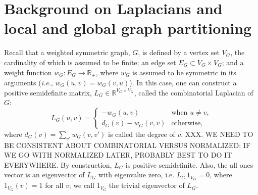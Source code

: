 \documentclass[12pt]{article}
\newcommand{\reals}{\mathbb{R}}
\theoremstyle{plain}
\begin{document}
\section{Background on Laplacians and local and global graph partitioning}
\label{S:introduction}

Recall that a weighted symmetric graph, $G$, is defined by a vertex set 
$V_G$, the cardinality of which 
is assumed to be finite; 
an edge set $E_G \subset V_G \times V_G$; 
and a weight function $w_G : E_G \to \reals_+$, where $w_G$ is assumed to 
be symmetric in its arguments (\emph{i.e.}, $w_G(u,v) = w_G(v,u)$).  
In this case, one can construct a positive
semidefinite matrix, $L_G \in \reals^{V_G \times V_G}$, called the 
combinatorial Laplacian of $G$:
\[
  L_G(u,v)
  =
  \begin{cases}
    - w_G(u,v) & \text{when $u \neq v$,} \\
    d_G(v) - w_G(v,v) & \text{otherwise,}
  \end{cases}
\]
where $d_G(v) = \sum_{v'} w_G(v,v')$ is called the degree of $v$.
XXX.  WE NEED TO BE CONSISTENT ABOUT COMBINATORIAL VERSUS NORMALIZED; IF WE GO WITH NORMALIZED LATER, PROBABLY BEST TO DO IT EVERYWHERE.
By construction, $L_G$ is positive semidefinite.  
Also, the all ones
vector is an eigenvector of $L_G$ with eigenvalue zero, i.e. $L_G \, 1_{V_G}
= 0$, where $1_{V_G}(v) = 1$ for all $v$; we call $1_{V_G}$ the
trivial eigenvector of $L_G$.  
\end{document}
